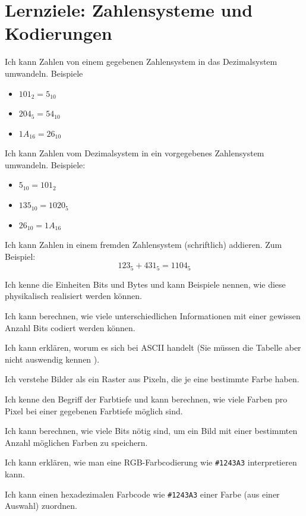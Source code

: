 \section*{Lernziele: Zahlensysteme und Kodierungen}
\begin{todolist}
\item Ich kann Zahlen von einem gegebenen Zahlensystem in das Dezimalsystem umwandeln. Beispiele
\begin{itemize}
\item $101_2 = 5_{10}$
\item $204_5 = 54_{10}$
\item $1A_{16} = 26_{10}$
\end{itemize}
\item Ich kann Zahlen vom Dezimalsystem in ein vorgegebenes Zahlensystem umwandeln. Beispiele:
\begin{itemize}
\item $5_{10} = 101_2$
\item $135_{10}=1020_5$
\item $26_{10}=1A_{16}$
\end{itemize}
\item Ich kann Zahlen in einem fremden Zahlensystem (schriftlich) addieren. Zum Beispiel:
\[123_5 + 431_5 = 1104_5\]
\item Ich kenne die Einheiten Bits und Bytes und kann Beispiele nennen, wie diese physikalisch realisiert werden können.
\item Ich kann berechnen, wie viele unterschiedlichen Informationen mit einer gewissen Anzahl Bits codiert werden können.
\item Ich kann erklären, worum es sich bei ASCII handelt (Sie müssen die Tabelle aber nicht auswendig kennen ).
\item Ich verstehe Bilder als ein Raster aus Pixeln, die je eine bestimmte Farbe haben.
\item Ich kenne den Begriff der Farbtiefe und kann berechnen, wie viele Farben pro Pixel bei einer gegebenen Farbtiefe möglich sind.
\item Ich kann berechnen, wie viele Bits nötig sind, um ein Bild mit einer bestimmten Anzahl möglichen Farben zu speichern.
\item Ich kann erklären, wie man eine RGB-Farbcodierung wie \texttt{\#1243A3} interpretieren kann.
\item Ich kann einen hexadezimalen Farbcode wie \texttt{\#1243A3} einer Farbe (aus einer Auswahl) zuordnen.
\end{todolist}
